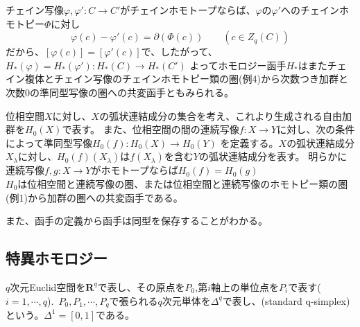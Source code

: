 \documentclass[dvipdfmx,a4paper,11pt]{jsarticle}
\begin{document}
\begin{tcolorbox}[title = 例6]
  チェイン写像$\varphi,\varphi' : C\to C'$がチェインホモトープならば、$\varphi$の$\varphi'$へのチェインホモトピー$\Phi$に対し
  \begin{equation*}
    \varphi(c)-\varphi'(c)=\partial(\Phi(c))\qquad (c\in Z_{q}(C))
  \end{equation*}
  だから、$[\varphi(c)]=[\varphi'(c)]$で、したがって、$H_{*}(\varphi)=H_{*}(\varphi'):H_{*}(C)\to H_{*}(C')$
  よってホモロジー函手$H_{*}$はまたチェイン複体とチェイン写像のチェインホモトピー類の圏(例4)から次数つき加群と次数$0$の準同型写像の圏への共変函手ともみられる。
\end{tcolorbox}

\begin{tcolorbox}[title = 例7]
  位相空間$X$に対し、$X$の弧状連結成分の集合を考え、これより生成される自由加群を$H_{0}(X)$で表す。
  また、位相空間の間の連続写像$f:X\to Y$に対し、次の条件によって準同型写像$H_{0}(f):H_{0}(X)\to H_{0}(Y)$
  を定義する。$X$の弧状連結成分$X_{\lambda}$に対し、$H_{0}(f)(X_{\lambda})$は$f(X_{\lambda})$を含む$Y$の弧状連結成分を表す。
  明らかに連続写像$f,g:X\to Y$がホモトープならば$H_{0}(f)=H_{0}(g)$\\
  $H_{0}$は位相空間と連続写像の圏、または位相空間と連続写像のホモトピー類の圏(例1)から加群の圏への共変函手である。
\end{tcolorbox}
また、函手の定義から函手は同型を保存することがわかる。

\clearpage

\subsection{特異ホモロジー}
$q$次元Euclid空間を$\mathbf{R}^q$で表し、その原点を$P_0$,第$i$軸上の単位点を$P_i$で表す($i=1, \cdots ,q$).\ 
$P_{0},P_{1},\cdots,P_{q}$で張られる$q$次元単体を$\Delta^q$で表し、(standard q-simplex)という。$\Delta^1=[0,1]$である。
\end{document}
